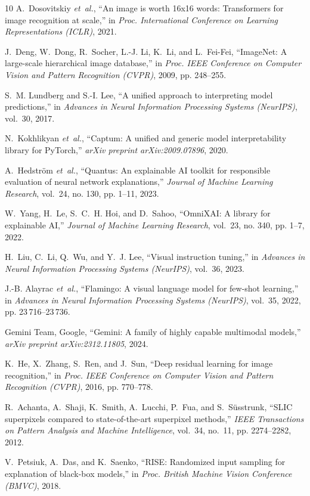 \documentclass[journal,10pt,twocolumn]{IEEEtran}
\begin{document}
\begin{thebibliography}{10}
A.~Dosovitskiy \emph{et~al.}, ``An image is worth 16x16 words: Transformers for image recognition at scale,''
  in \emph{Proc. International Conference on Learning Representations (ICLR)}, 2021.

J.~Deng, W.~Dong, R.~Socher, L.-J. Li, K.~Li, and L.~Fei-Fei, ``ImageNet: A large-scale hierarchical image database,''
  in \emph{Proc. IEEE Conference on Computer Vision and Pattern Recognition (CVPR)}, 2009, pp. 248--255.

S.~M. Lundberg and S.-I. Lee, ``A unified approach to interpreting model predictions,''
  in \emph{Advances in Neural Information Processing Systems (NeurIPS)}, vol.~30, 2017.

N.~Kokhlikyan \emph{et~al.}, ``Captum: A unified and generic model interpretability library for PyTorch,''
  \emph{arXiv preprint arXiv:2009.07896}, 2020.

A.~Hedstr{\"o}m \emph{et~al.}, ``Quantus: An explainable AI toolkit for responsible evaluation of neural network explanations,''
  \emph{Journal of Machine Learning Research}, vol.~24, no. 130, pp. 1--11, 2023.

W.~Yang, H.~Le, S.~C.~H. Hoi, and D.~Sahoo, ``OmniXAI: A library for explainable AI,''
  \emph{Journal of Machine Learning Research}, vol.~23, no. 340, pp. 1--7, 2022.

H.~Liu, C.~Li, Q.~Wu, and Y.~J. Lee, ``Visual instruction tuning,''
  in \emph{Advances in Neural Information Processing Systems (NeurIPS)}, vol.~36, 2023.

J.-B. Alayrac \emph{et~al.}, ``Flamingo: A visual language model for few-shot learning,''
  in \emph{Advances in Neural Information Processing Systems (NeurIPS)}, vol.~35, 2022, pp. 23\,716--23\,736.

{Gemini Team, Google}, ``Gemini: A family of highly capable multimodal models,''
  \emph{arXiv preprint arXiv:2312.11805}, 2024.

K.~He, X.~Zhang, S.~Ren, and J.~Sun, ``Deep residual learning for image recognition,''
  in \emph{Proc. IEEE Conference on Computer Vision and Pattern Recognition (CVPR)}, 2016, pp. 770--778.

R.~Achanta, A.~Shaji, K.~Smith, A.~Lucchi, P.~Fua, and S.~S{\"u}sstrunk,
  ``SLIC superpixels compared to state-of-the-art superpixel methods,''
  \emph{IEEE Transactions on Pattern Analysis and Machine Intelligence}, vol.~34, no.~11, pp. 2274--2282, 2012.

V.~Petsiuk, A.~Das, and K.~Saenko, ``RISE: Randomized input sampling for explanation of black-box models,''
  in \emph{Proc. British Machine Vision Conference (BMVC)}, 2018.

\end{thebibliography}
\end{document}
